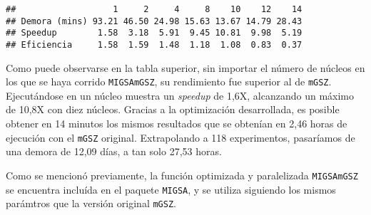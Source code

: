 \documentclass[12pt,twoside]{reedthesis}
\newenvironment{Shaded}{\begin{snugshade}}{\end{snugshade}}
\newcommand{\CommentTok}[1]{\textcolor[rgb]{0.56,0.35,0.01}{\textit{#1}}}
\newcommand{\ControlFlowTok}[1]{\textcolor[rgb]{0.13,0.29,0.53}{\textbf{#1}}}
\newcommand{\DataTypeTok}[1]{\textcolor[rgb]{0.13,0.29,0.53}{#1}}
\newcommand{\DecValTok}[1]{\textcolor[rgb]{0.00,0.00,0.81}{#1}}
\newcommand{\KeywordTok}[1]{\textcolor[rgb]{0.13,0.29,0.53}{\textbf{#1}}}
\newcommand{\NormalTok}[1]{#1}
\newcommand{\OperatorTok}[1]{\textcolor[rgb]{0.81,0.36,0.00}{\textbf{#1}}}
\newcommand{\StringTok}[1]{\textcolor[rgb]{0.31,0.60,0.02}{#1}}
\begin{document}
\begin{Shaded}
\end{Shaded}
\begin{verbatim}
##                   1     2     4     8    10    12    14
## Demora (mins) 93.21 46.50 24.98 15.63 13.67 14.79 28.43
## Speedup        1.58  3.18  5.91  9.45 10.81  9.98  5.19
## Eficiencia     1.58  1.59  1.48  1.18  1.08  0.83  0.37
\end{verbatim}
\par

Como puede observarse en la tabla superior, sin importar el número de núcleos en los que se haya corrido \texttt{MIGSAmGSZ}, su rendimiento fue superior al de \texttt{mGSZ}. Ejecutándose en un núcleo muestra un \emph{speedup} de 1,6X, alcanzando un máximo de 10,8X con diez núcleos. Gracias a la optimización desarrollada, es posible obtener en 14 minutos los mismos resultados que se obtenían en 2,46 horas de ejecución con el \texttt{mGSZ} original. Extrapolando a 118 experimentos, pasaríamos de una demora de 12,09 días, a tan solo 27,53 horas.

\par

Como se mencionó previamente, la función optimizada y paralelizada \texttt{MIGSAmGSZ} se encuentra incluída en el paquete \texttt{MIGSA}, y se utiliza siguiendo los mismos parámtros que la versión original \texttt{mGSZ}.
\end{document}
